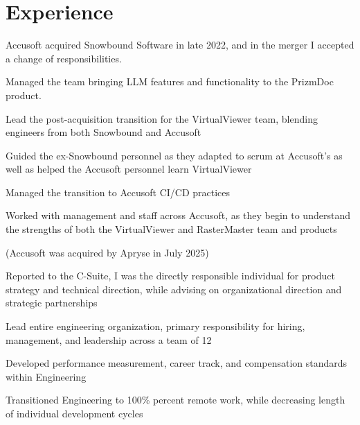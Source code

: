 \documentclass[letterpaper,10pt]{article}
\begin{document}

  \section{Experience}

  \begin{resume_list}
    \item Accusoft acquired Snowbound Software in late 2022, and in the merger I accepted a change of responsibilities.
    \item Managed the team bringing LLM features and functionality to the PrizmDoc product.
    \item Lead the post-acquisition transition for the VirtualViewer team, blending engineers from both Snowbound and Accusoft 
    \item Guided the ex-Snowbound personnel as they adapted to scrum at Accusoft's as well as helped the Accusoft personnel learn VirtualViewer
    \item Managed the transition to Accusoft CI/CD practices
    \item Worked with management and staff across Accusoft, as they begin to understand the strengths of both the VirtualViewer and RasterMaster team and products
    \item (Accusoft was acquired by Apryse in July 2025)
  \end{resume_list}

  \begin{resume_list}
    \item Reported to the C-Suite, I was the directly responsible individual for product strategy and technical direction, while advising on organizational direction and strategic partnerships
    \item Lead entire engineering organization, primary responsibility for hiring, management, and leadership across a team of 12
    \item Developed performance measurement, career track, and compensation standards within Engineering
    \item Transitioned Engineering to 100\% percent remote work, while decreasing length of individual development cycles
  \end{resume_list}
     
\end{document}
